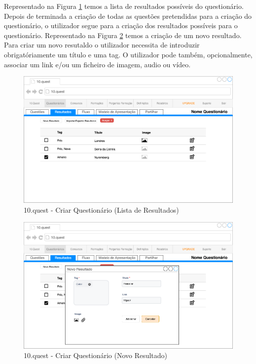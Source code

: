 Representado na Figura \ref{10q-result} temos a lista de resultados possíveis do questionário. Depois de terminada a criação de todas as questões pretendidas para a criação do questionário, o utilizador segue para a criação dos resultados possíveis para o questionário. 
Representado na Figura \ref{10q-Nresult} temos a criação de um novo resultado. Para criar um novo resutaldo o utilizador necessita de introduzir obrigatóriamente um título e uma tag. O utilizador pode também, opcionalmente, associar um link e/ou um ficheiro de imagem, audio ou vídeo.

\begin{figure}[ht!]
	\begin{center}
		\includegraphics[width=1\textwidth]{img/prototipos/15.png}
		\caption{10.quest - Criar Questionário (Lista de Resultados)}
		\label{10q-result}
	\end{center}
\end{figure}

\begin{figure}[ht!]
	\begin{center}
		\includegraphics[width=1\textwidth]{img/prototipos/16.png}
		\caption{10.quest - Criar Questionário (Novo Resultado)}
		\label{10q-Nresult}
	\end{center}
\end{figure}
\newpage

